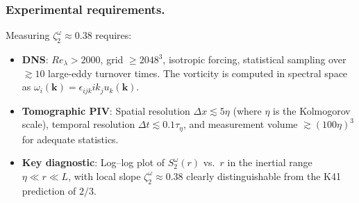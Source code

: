 \subsubsection*{Experimental requirements.}
Measuring $\zeta_2^\omega\approx 0.38$ requires:
\begin{itemize}
\item \textbf{DNS}: $Re_\lambda>2000$, grid $\geq 2048^3$, isotropic forcing, statistical sampling over $\gtrsim 10$ large-eddy turnover times. The vorticity is computed in spectral space as $\omega_i(\mathbf{k})=\epsilon_{ijk}ik_j u_k(\mathbf{k})$.
\item \textbf{Tomographic PIV}: Spatial resolution $\Delta x\lesssim 5\eta$ (where $\eta$ is the Kolmogorov scale), temporal resolution $\Delta t\lesssim 0.1\tau_\eta$, and measurement volume $\gtrsim (100\eta)^3$ for adequate statistics.
\item \textbf{Key diagnostic}: Log--log plot of $S_2^\omega(r)$ vs.\ $r$ in the inertial range $\eta\ll r\ll L$, with local slope $\zeta_2^\omega\approx 0.38$ clearly distinguishable from the K41 prediction of $2/3$.
\end{itemize}





